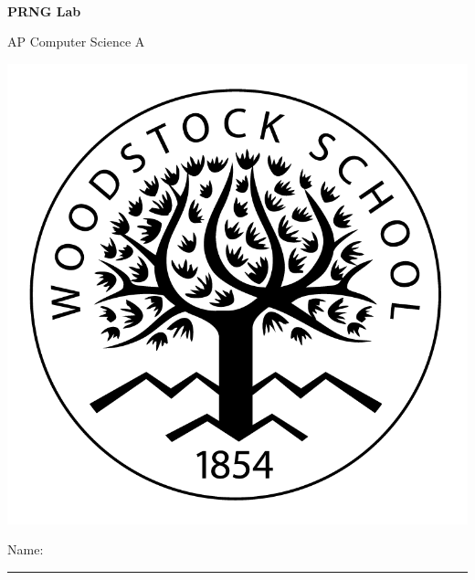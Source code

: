 

\def\LabCourse{AP Computer Science A}
\def\LabNumber{04}
\def\LabTitle{PRNG Lab}


	\begin{coverpages}
		\ \\[2cm]
		\begin{center}
			\huge
			\textbf{\LabTitle}

			\Large
			\LabCourse
		\end{center}

		\vspace{1.5cm}

		\begin{center}
			\includegraphics[scale=0.45]{graphics/logo_black}

			\vspace{2.5cm}

			\Large
			Name: \rule{11.5cm}{0.1pt}
		\end{center}
	\end{coverpages}

	\blankpage

	\thispagestyle{empty}
	\tableofcontents

	\pagebreak

